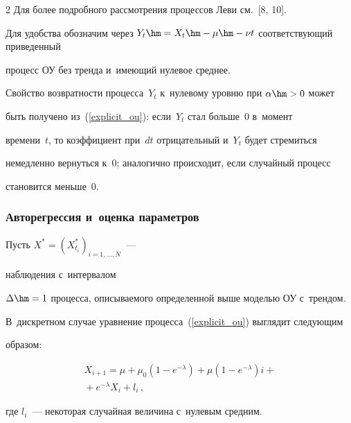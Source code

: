 \begin{multicols}{2}
Для более подробного рассмотрения процессов Леви см.~[8, 10].





Для удобства обозначим через $Y_t\hm = X_t \hm-\mu\hm- \nu t$ соответствующий приведенный 


процесс ОУ без тренда и~имеющий нулевое среднее.





Свойство возвратности  процесса~$Y_t$ к~нулевому уровню  при $\alpha \hm> 0$ может 


быть получено из~(\ref{explicit_ou}):  если~$Y_t$ стал больше~0 в~момент 


времени~$t$, то коэффициент при~$dt$ отрицательный и~$Y_t$ будет стремиться 


немедленно вернуться к~0; аналогично происходит, если случайный процесс 


становится меньше~0.





\subsubsection{Авторегрессия и~оценка параметров}





Пусть $ X ^ * = {\left(X^*_{t_i}\right)}_ {i = 1, \ldots, N} $~--- 


наблюдения с~интервалом 


$\Delta \hm=  1$ процесса, описываемого определенной выше моделью ОУ с~трендом. 


В~дискретном случае уравнение процесса~(\ref{explicit_ou}) выглядит следующим 


образом:


        \begin{multline}


         \label{OUtrend_d}


        X_{i+1} = \mu + \mu_0\left(1 - e^{-\lambda}\right) + 


        \mu \left(1 - e^{-\lambda}\right)i+ {}\\


        {}+e^{-\lambda } X_{i} + l_i\,,


        \end{multline}


        где $l_i $~--- некоторая случайная величина с~нулевым средним.






\end{multicols}
